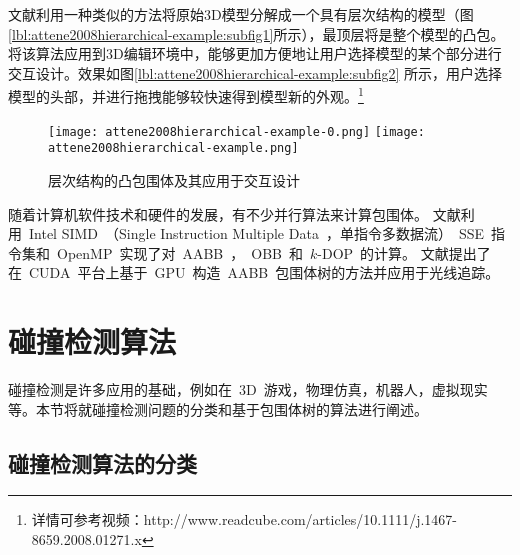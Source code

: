 文献\cite{attene2008hierarchical}利用一种类似的方法将原始3D模型分解成一个具有层次结构的模型（图\ref{lbl:attene2008hierarchical-example:subfig1}所示），最顶层将是整个模型的凸包。将该算法应用到3D编辑环境中，能够更加方便地让用户选择模型的某个部分进行交互设计。效果如图\ref{lbl:attene2008hierarchical-example:subfig2} 所示，用户选择模型的头部，并进行拖拽能够较快速得到模型新的外观。\footnote{详情可参考视频：http://www.readcube.com/articles/10.1111/j.1467-8659.2008.01271.x }

\begin{figure}[H]
  \centering
    {\texttt{[image: attene2008hierarchical-example-0.png]}}
    {\texttt{[image: attene2008hierarchical-example.png]}}
  \caption{层次结构的凸包围体及其应用于交互设计\cite{attene2008hierarchical}}
  \label{lbl:attene2008hierarchical-example}
\end{figure}

随着计算机软件技术和硬件的发展，有不少并行算法来计算包围体。
文献\cite{karlsson2010parallel}利用~Intel SIMD~（Single Instruction Multiple Data~，单指令多数据流）~SSE~指令集和~OpenMP~实现了对~AABB~，~OBB~和~$k$-DOP~的计算。
文献\cite{lauterbach2009fast}提出了在~CUDA~平台上基于~GPU~构造~AABB~包围体树的方法并应用于光线追踪。

\section{碰撞检测算法}
\label{sec:collisiondetection}

碰撞检测是许多应用的基础，例如在~3D~游戏，物理仿真，机器人，虚拟现实等。本节将就碰撞检测问题的分类和基于包围体树的算法进行阐述。

\subsection{碰撞检测算法的分类}
\label{sec:cd-category}

